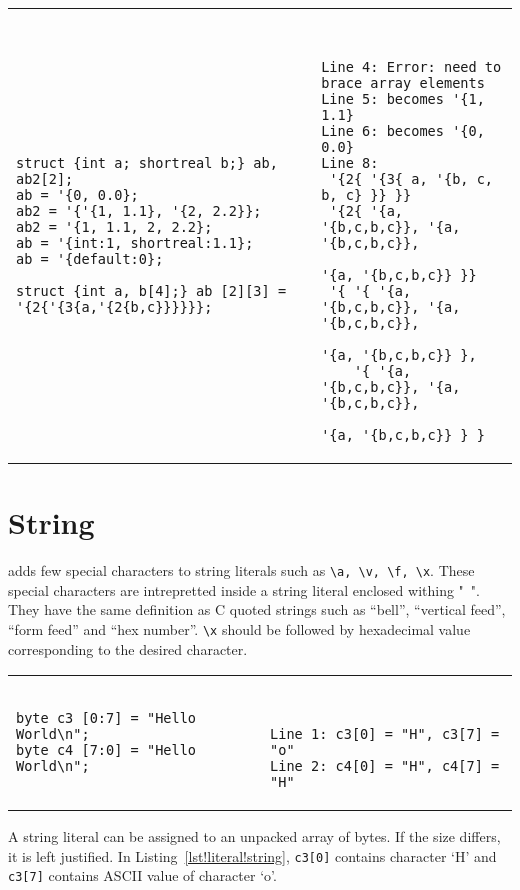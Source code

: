 \begin{table}
\begin{tabular}{p{} p{}}
\begin{lstlisting}[label=lst!literal!struct, caption=Structure Literals]
struct {int a; shortreal b;} ab, ab2[2];
ab = '{0, 0.0};
ab2 = '{'{1, 1.1}, '{2, 2.2}};
ab2 = '{1, 1.1, 2, 2.2};
ab = '{int:1, shortreal:1.1};
ab = '{default:0};

struct {int a, b[4];} ab [2][3] = '{2{'{3{a,'{2{b,c}}}}}};
\end{lstlisting}
&
\begin{tbldesc}
\begin{verbatim}


Line 4: Error: need to brace array elements
Line 5: becomes '{1, 1.1}
Line 6: becomes '{0, 0.0}
Line 8:
 '{2{ '{3{ a, '{b, c, b, c} }} }}
 '{2{ '{a, '{b,c,b,c}}, '{a, '{b,c,b,c}},
                      '{a, '{b,c,b,c}} }}
 '{ '{ '{a, '{b,c,b,c}}, '{a, '{b,c,b,c}},
                      '{a, '{b,c,b,c}} },
    '{ '{a, '{b,c,b,c}}, '{a, '{b,c,b,c}},
                      '{a, '{b,c,b,c}} } }
\end{verbatim}
\end{tbldesc}
\end{tabular}
\end{table}

\section{String}
\lsvlog adds few special characters to string literals such as
\texttt{\textbackslash{}a, \textbackslash{}v, \textbackslash{}f,
  \textbackslash{}x}. These special characters are intrepretted inside
a string literal enclosed withing "~". They have the same definition
as C quoted strings such as ``bell'', ``vertical feed'', ``form feed''
and ``hex number''. \texttt{\textbackslash{}x} should be followed by
hexadecimal value corresponding to the desired character.

\begin{table}
\begin{tabular}{p{} p{}}
\begin{lstlisting}[label=lst!literal!string, caption=String Literal
    Examples]
byte c3 [0:7] = "Hello World\n";
byte c4 [7:0] = "Hello World\n";
\end{lstlisting}
&
\begin{tbldesc}
\begin{verbatim}


Line 1: c3[0] = "H", c3[7] = "o"
Line 2: c4[0] = "H", c4[7] = "H"
\end{verbatim}
\end{tbldesc}
\end{tabular}
\end{table}

A string literal can be assigned to an unpacked array of bytes. If the
size differs, it is left justified. In
Listing~\ref{lst!literal!string}, \texttt{c3[0]} contains character
`H' and \texttt{c3[7]} contains ASCII value of character `o'.
